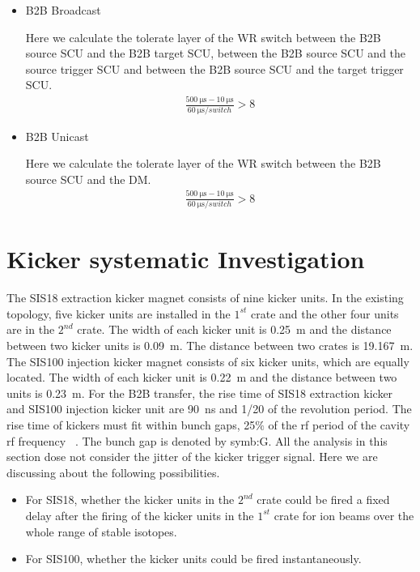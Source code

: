 \begin{itemize}
    \item B2B Broadcast

		Here we calculate the tolerate layer of the WR switch between the B2B source \gls{SCU} and the B2B target SCU, between the B2B source SCU and the source trigger SCU and between the B2B source SCU and the target trigger SCU.  
		\begin{equation}
		\begin{aligned}
			\frac{\SI{500}{\us}-\SI{10}{\us}}{\SI{60}{\us/switch}}> 8
		\label {num_switch_b}
		\end{aligned}
		\end{equation}
	\item B2B Unicast

		Here we calculate the tolerate layer of the WR switch between the B2B source SCU and the DM.
		\begin{equation}
		\begin{aligned}
			\frac{\SI{500}{\us}-\SI{10}{\us}}{\SI{60}{\us/switch}}> 8
		\label {num_switch_b}
		\end{aligned}
		\end{equation}
\end{itemize}

\section{Kicker systematic Investigation}
The SIS18 extraction kicker magnet consists of nine kicker units. In the existing topology, five kicker units are installed in the $1^{st}$ crate and the other four units are in the $2^{nd}$ crate. The width of each kicker unit is \SI{0.25}{m} and the distance between two kicker units is \SI{0.09}{m}. The distance between two crates is \SI{19.167}{m}. The SIS100 injection kicker magnet consists of six kicker units, which are equally located. The width of each kicker unit is \SI{0.22}{m} and the distance between two units is \SI{0.23}{m}. For the B2B transfer, the rise time of SIS18 extraction kicker and SIS100 injection kicker unit are \SI{90}{ns} and 1/20 of the revolution period. The rise time of kickers must fit within bunch gaps, 25$\%$ of the rf period of the cavity rf frequency ~\cite{udo_injection_2014, liebermann_sis100_2013}. The bunch gap is denoted by \gls{symb:G}. All the analysis in this section dose not consider the jitter of the kicker trigger signal. Here we are discussing about the following possibilities. 
\begin{itemize}
    \item For SIS18, whether the kicker units in the $2^{nd}$ crate could be fired a fixed delay after the firing of the kicker units in the $1^{st}$ crate for ion beams over the whole range of stable isotopes. 
    \item For SIS100, whether the kicker units could be fired instantaneously. 
\end{itemize} 

